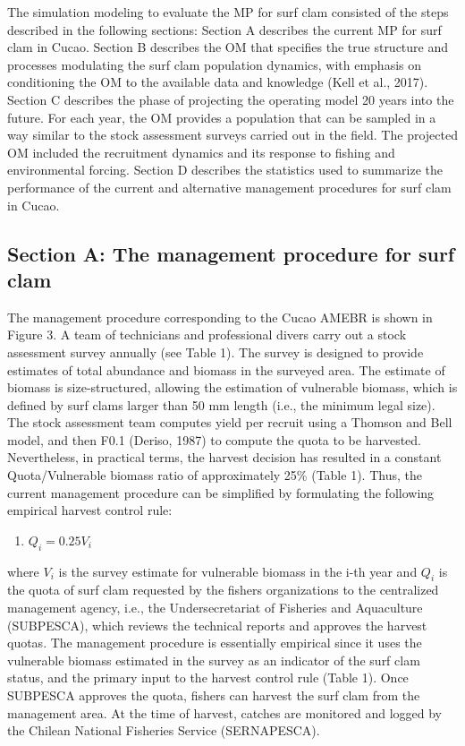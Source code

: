 \documentclass[]{article}
\providecommand{\tightlist}{%
  \setlength{\itemsep}{0pt}\setlength{\parskip}{0pt}}
\begin{document}
The simulation modeling to evaluate the MP for surf clam consisted of
the steps described in the following sections: Section A describes the
current MP for surf clam in Cucao. Section B describes the OM that
specifies the true structure and processes modulating the surf clam
population dynamics, with emphasis on conditioning the OM to the
available data and knowledge (Kell et al., 2017). Section C describes
the phase of projecting the operating model 20 years into the future.
For each year, the OM provides a population that can be sampled in a way
similar to the stock assessment surveys carried out in the field. The
projected OM included the recruitment dynamics and its response to
fishing and environmental forcing. Section D describes the statistics
used to summarize the performance of the current and alternative
management procedures for surf clam in Cucao.

\hypertarget{section-a-the-management-procedure-for-surf-clam}{%
\subsection{Section A: The management procedure for surf
clam}\label{section-a-the-management-procedure-for-surf-clam}}

The management procedure corresponding to the Cucao AMEBR is shown in
Figure 3. A team of technicians and professional divers carry out a
stock assessment survey annually (see Table 1). The survey is designed
to provide estimates of total abundance and biomass in the surveyed
area. The estimate of biomass is size-structured, allowing the
estimation of vulnerable biomass, which is defined by surf clams larger
than 50 mm length (i.e., the minimum legal size). The stock assessment
team computes yield per recruit using a Thomson and Bell model, and then
F0.1 (Deriso, 1987) to compute the quota to be harvested. Nevertheless,
in practical terms, the harvest decision has resulted in a constant
Quota/Vulnerable biomass ratio of approximately 25\% (Table 1). Thus,
the current management procedure can be simplified by formulating the
following empirical harvest control rule:

\begin{enumerate}
\def\labelenumi{\arabic{enumi})}
\tightlist
\item
  \(Q_i=0.25 V_i\)
\end{enumerate}

where \(V_i\) is the survey estimate for vulnerable biomass in the i-th
year and \(Q_i\) is the quota of surf clam requested by the fishers
organizations to the centralized management agency, i.e., the
Undersecretariat of Fisheries and Aquaculture (SUBPESCA), which reviews
the technical reports and approves the harvest quotas. The management
procedure is essentially empirical since it uses the vulnerable biomass
estimated in the survey as an indicator of the surf clam status, and the
primary input to the harvest control rule (Table 1). Once SUBPESCA
approves the quota, fishers can harvest the surf clam from the
management area. At the time of harvest, catches are monitored and
logged by the Chilean National Fisheries Service (SERNAPESCA).
\end{document}
